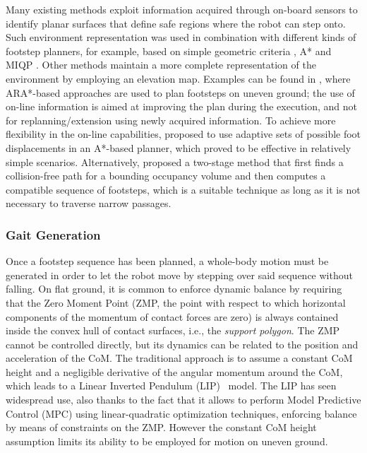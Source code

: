 Many existing methods exploit information acquired through on-board sensors to identify planar surfaces that define safe regions where the robot can step onto.
Such environment representation was used in combination with different kinds of footstep planners, for example, based on simple geometric criteria \cite{Okada_ICRA2005}, A* \cite{Chestnutt_IROS2009} and MIQP \cite{Fallon_HUM2015}.   
Other methods maintain a more complete representation of the environment by employing an elevation map.
Examples can be found in \cite{Maier_IROS2013, Stumpf_HUM2014}, where ARA*-based approaches are used to plan footsteps on uneven ground; the use of on-line information is aimed at improving the plan during the execution, and not for replanning/extension using newly acquired information.
To achieve more flexibility in the on-line capabilities, \cite{Karkowski_HUM2016} proposed to use adaptive sets of possible foot displacements in an A*-based planner, which proved to be effective in relatively simple scenarios. Alternatively, \cite{Yamamoto_AdvR2021} proposed a two-stage method that first finds a collision-free path for a bounding occupancy volume and then computes a compatible sequence of footsteps, which is a suitable technique as long as it is not necessary to traverse narrow passages.

\subsubsection{Gait Generation}

Once a footstep sequence has been planned, a whole-body motion must be generated in order to let the robot move by stepping over said sequence without falling. On flat ground, it is common to enforce dynamic balance by requiring that the Zero Moment Point (ZMP, the point with respect to which horizontal components of the momentum of contact forces are zero) is always contained inside the convex hull of contact surfaces, i.e., the \emph{support polygon}.
The ZMP cannot be controlled directly, but its dynamics can be related to the position and acceleration of the CoM. The traditional approach is to assume a constant CoM height and a negligible derivative of the angular momentum around the CoM, which leads to a Linear Inverted Pendulum (LIP)~\cite{KaKaKaFuHaYoHi:03} model. The LIP has seen widespread use, also thanks to the fact that it allows to perform Model Predictive Control (MPC) using linear-quadratic optimization techniques, enforcing balance by means of constraints on the ZMP. However the constant CoM height assumption limits its ability to be employed for motion on uneven ground.

